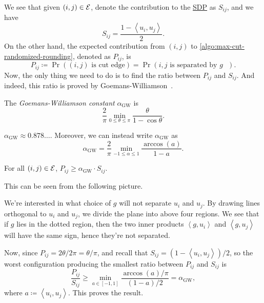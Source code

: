 We see that given \((i, j)\in \mathcal{\MakeUppercase{e}} \), denote the contribution to the \hyperref[eq:max-cut]{SDP} as \(S_{ij} \), and we have
\[
	S_{ij}= \frac{1 - \left\langle u_i, u_j \right\rangle }{2}.
\]
On the other hand, the expected contribution from \((i, j)\) to \autoref{algo:max-cut-randomized-rounding}, denoted as \(P_{ij} \), is
\[
	P_{ij}\coloneqq  \Pr((i, j)\text{ is cut edge} ) = \Pr(i, j \text{ is separated by \(g\) } ).
\]
Now, the only thing we need to do is to find the ratio between \(P_{ij} \) and \(S_{ij} \). And indeed, this ratio is proved by Goemans-Williamson~\cite{goemans1995improved}.

\begin{notation}
	The \emph{Goemans-Williamson constant} \(\alpha _{\mathrm{GW} }\) is
	\[
		\frac{2}{\pi }\min _{0 \leq \theta \leq \pi }\frac{\theta }{1 - \cos \theta }.
	\]
\end{notation}

\begin{remark}
	\(\alpha _{\mathrm{GW} }\approx 0.878\ldots \). Moreover, we can instead write \(\alpha _\mathrm{GW} \) as
	\[
		\alpha _{\mathrm{GW} } = \frac{2}{\pi }\min _{-1\leq \alpha \leq 1} \frac{\arccos(a)}{1 - a}.
	\]
\end{remark}

\begin{lemma}\label{lma:lec14-2}
	For all \((i, j)\in \mathcal{\MakeUppercase{e}} \), \(P_{ij} \geq \alpha _{\mathrm{GW} } \cdot S_{ij} \).
\end{lemma}
\begin{explanation}
	This can be seen from the following picture.
	\begin{center}
	\end{center}
	We're interested in what choice of \(g\) will not separate \(u_i\) and \(u_j\). By drawing lines orthogonal to \(u_i\) and \(u_j\), we divide the plane into above four regions. We see that if \(g\) lies in the dotted region, then the two inner products \(\left\langle g, u_i \right\rangle \) and \(\left\langle g, u_j \right\rangle \) will have the same sign, hence they're not separated.

	Now, since \(P_{ij} = 2\theta / 2\pi = \theta / \pi\), and recall that \(S_{ij} = (1 - \left\langle u_i, u_j \right\rangle) / 2 \), so the worst configuration producing the smallest ratio between \(P_{ij} \) and \(S_{ij} \) is
	\[
		\frac{P_{ij}}{S_{ij} } \geq \min _{a\in [-1, 1]} \frac{\arccos(a) / \pi }{(1-a) / 2} = \alpha _\mathrm{GW},
	\]
	where \(a \coloneqq \left\langle u_i, u_j \right\rangle\). This proves the result.
\end{explanation}

